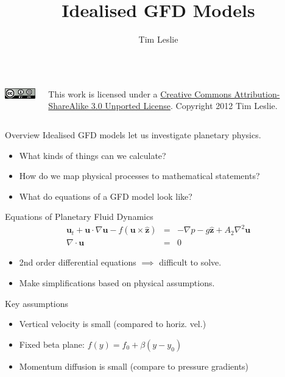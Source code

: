 \documentclass[a4paper]{beamer}
\title{Idealised GFD Models}
\author{Tim Leslie}\institute{Breakaway Consulting Pty. Ltd.\\Climate Change Research Centre}
\begin{document}
\begin{frame}
\titlepage
\begin{columns}
    \begin{column}{0.25\textwidth}
      \includegraphics[keepaspectratio]{CC-BY-SA.png}
    \end{column}
    \begin{column}{0.75\textwidth}
      This work is licensed under a \href{http://creativecommons.org/licenses/by-sa/3.0/}{Creative Commons Attribution-ShareAlike 3.0 Unported License}. Copyright 2012 Tim Leslie.
    \end{column}
\end{columns}
\end{frame}

\begin{frame}{Overview}
Idealised GFD models let us investigate planetary physics.
\begin{itemize}
\item What kinds of things can we calculate?
\item How do we map physical processes to mathematical statements?
\item What do equations of a GFD model look like?
\end{itemize}
\end{frame}

\begin{frame}{Equations of Planetary Fluid Dynamics}
\begin{eqnarray}
\mathbf{u}_t + \mathbf{u}\cdot\nabla\mathbf{u} - f(\mathbf{u}\times\mathbf{\hat{z}}) & = & -\nabla p -g\mathbf{\hat{z}} + A_2\nabla^2\mathbf{u}\\
\nabla\cdot\mathbf{u} & = & 0
\end{eqnarray}
\begin{itemize}
\item 2nd order differential equations $\implies$ difficult to solve.
\item Make simplifications based on physical assumptions.
\end{itemize}
\end{frame}

\begin{frame}{Key assumptions}
\begin{itemize}
\item Vertical velocity is small (compared to horiz. vel.)
\item Fixed beta plane: $f(y) = f_0 + \beta(y - y_0)$
\item Momentum diffusion is small (compare to pressure gradients)
\end{itemize}
\end{frame}
\end{document}

